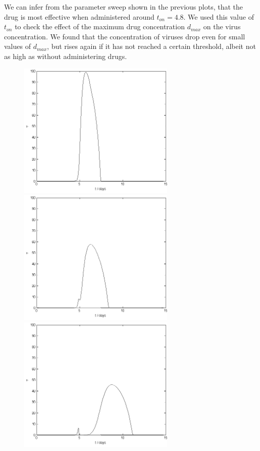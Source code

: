 \documentclass[a4paper, 12pt]{report}
\begin{document}
We can infer from the parameter sweep shown in the previous plots, that the drug is most effective when administered around $t_{on} = 4.8$. We used this value of $t_{on}$ to check the effect of the maximum drug concentration $d_{max}$ on the virus concentration. We found that the concentration of viruses drop even for small values of $d_{max}$, but rises again if it has not reached a certain threshold, albeit not as high as without administering drugs.
\newpage

\begin{figure}[h!]
\includegraphics[width=75mm]{drug_zero.png}
\includegraphics[width=75mm]{drug_one.png}
\newline
\includegraphics[width=75mm]{drug_two.png}

\end{figure}
\end{document}
